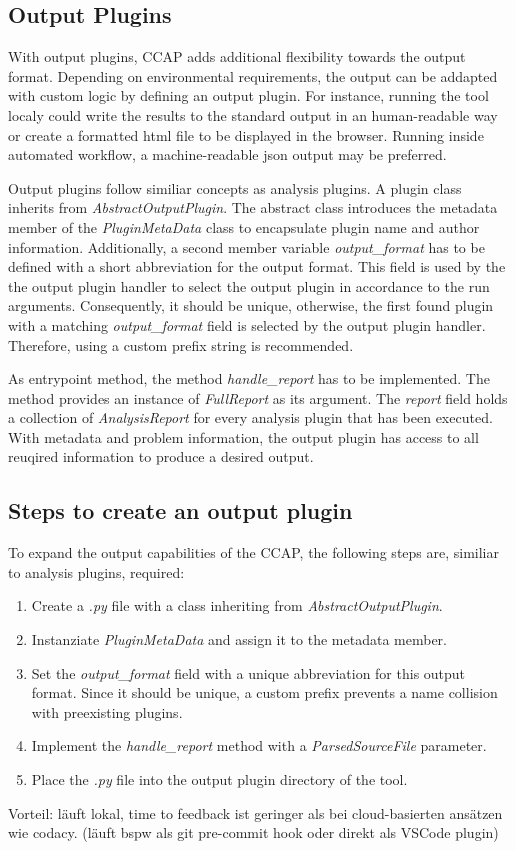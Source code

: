 \subsection{Output Plugins}
With output plugins, CCAP adds additional flexibility towards the output format. Depending on environmental requirements, the output can be addapted with custom logic by defining an output plugin. For instance, running the tool localy could write the results to the standard output in an human-readable way or create a formatted html file to be displayed in the browser. Running inside automated workflow, a machine-readable json output may be preferred.

Output plugins follow similiar concepts as analysis plugins. A plugin class inherits from \textit{AbstractOutputPlugin}. The abstract class introduces the metadata member of the \textit{PluginMetaData} class to encapsulate plugin name and author information. Additionally, a second member variable \textit{output\_format} has to be defined with a short abbreviation for the output format. This field is used by the the output plugin handler to select the output plugin in accordance to the run arguments. Consequently, it should be unique, otherwise, the first found plugin with a matching \textit{output\_format} field is selected by the output plugin handler. Therefore, using a custom prefix string is recommended.

As entrypoint method, the method \textit{handle\_report} has to be implemented. The method provides an instance of \textit{FullReport} as its argument. The  \textit{report} field holds a collection of  \textit{AnalysisReport} for every analysis plugin that has been executed. With metadata and problem information, the output plugin has access to all reuqired information to produce a desired output.

\subsection{Steps to create an output plugin}
To expand the output capabilities of the CCAP, the following steps are, similiar to analysis plugins, required:
\begin{enumerate}
    \item Create a \textit{.py} file with a class inheriting from \textit{AbstractOutputPlugin}.
    \item Instanziate \textit{PluginMetaData} and assign it to the metadata member.
    \item Set the \textit{output\_format} field with a unique abbreviation for this output format. Since it should be unique, a custom prefix prevents a name collision with preexisting plugins.
    \item Implement the \textit{handle\_report} method with a \textit{ParsedSourceFile} parameter. 
    \item Place the \textit{.py} file into the output plugin directory of the tool.
\end{enumerate}

Vorteil: läuft lokal, time to feedback ist geringer als bei cloud-basierten ansätzen wie codacy. (läuft bspw als git pre-commit hook oder direkt als VSCode plugin)